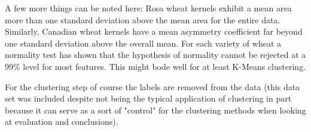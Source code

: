 \begin{table}[H]
\begin{center}
\end{center}
\caption{Seeds Data Set Statistics Summary}
\label{tab:seeds_key_facts}
\end{table}

A few more things can be noted here: Rosa wheat kernels exhibit a mean area more than one standard deviation above the mean area for the entire data. Similarly, Canadian wheat kernels have a mean asymmetry coefficient far beyond one standard deviation above the overall mean. For each variety of wheat a normality test \cite{d1973tests} has shown that the hypothesis of normality cannot be rejected at a 99\% level for most features. This might bode well for at least K-Means clustering.


For the clustering step of course the labels are removed from the data (this data set was included despite not being the typical application of clustering in part because it can serve as a sort of "control" for the clustering methods when looking at evaluation and conclusions).




